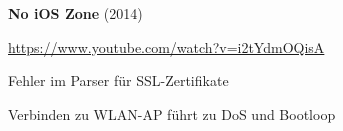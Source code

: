 \begin{frame}
	\centering
	\textbf{No iOS Zone} (2014)
	\begin{block}{}
		\url{https://www.youtube.com/watch?v=i2tYdmOQisA}
	\end{block}
	\begin{block}{}
		Fehler im Parser für SSL-Zertifikate
	\end{block}
	\begin{block}{}
		Verbinden zu WLAN-AP führt zu DoS und Bootloop
	\end{block}
\end{frame}